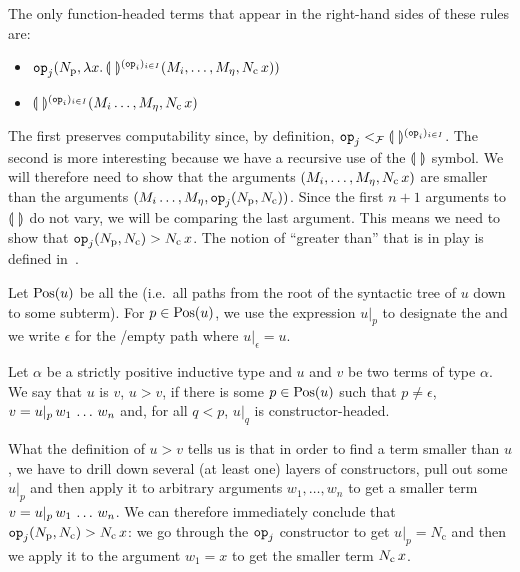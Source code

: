 The only function-headed terms that appear in the right-hand sides of these
rules are:

\begin{itemize}
\item
  $\mathtt{op}_j(N_{\mathrm{p}}, \lambda x.\, \llparenthesis \,  \, \rrparenthesis^{(\mathtt{op}_i)_{i \in I}}(M_i,
    \ldots, M_\eta, N_{\mathrm{c}}\,x))$
\item
  $\llparenthesis \,  \, \rrparenthesis^{(\mathtt{op}_i)_{i \in I}}(M_i \ldots, M_\eta,
  N_{\mathrm{c}}\,x)$
\end{itemize}

The first preserves computability since, by definition,
$\mathtt{op}_j <_{\mathcal{F}} \llparenthesis \,  \, \rrparenthesis^{(\mathtt{op}_i)_{i \in I}}$. The second is more
interesting because we have a recursive use of the $\llparenthesis \,  \, \rrparenthesis$ symbol. We
will therefore need to show that the arguments
$(M_i, \ldots, M_\eta, N_{\mathrm{c}}\,x)$ are smaller than the
arguments
$(M_i \ldots, M_\eta, \mathtt{op}_j(N_{\mathrm{p}}, N_{\mathrm{c}}))$. Since
the first $n + 1$ arguments to $\llparenthesis \,  \, \rrparenthesis$ do not vary, we will be
comparing the last argument. This means we need to show that
$\mathtt{op}_j(N_{\mathrm{p}}, N_{\mathrm{c}}) > N_{\mathrm{c}}\,x$. The
notion of ``greater than'' that is in play is defined
in~\cite{blanqui2002inductive}.

\begin{notation}
  Let $\operatorname{Pos}(u)$ be all the  (i.e.\ all
  paths from the root of the syntactic tree of $u$ down to some
  subterm). For $p \in \operatorname{Pos}(u)$, we use the expression $u|_p$ to designate
  the  and we write $\epsilon$ for
  the /empty path where $u|_\epsilon = u$.
\end{notation}

\begin{definition}\label{def:argument-ordering}
  Let $\alpha$ be a strictly positive inductive type and $u$ and $v$ be two
  terms of type $\alpha$. We say that $u$ is  $v$,
  $u > v$, if there is some $p \in \operatorname{Pos}(u)$ such that $p \neq \epsilon$,
  $v = u|_p\,w_1\,\ldots\,w_n$ and, for all $q < p$, $u|_q$ is
  constructor-headed.
\end{definition}

What the definition of $u > v$ tells us is that in order to find a term
smaller than $u$, we have to drill down several (at least one) layers of
constructors, pull out some $u|_p$ and then apply it to arbitrary arguments
$w_1, \ldots, w_n$ to get a smaller term
$v = u|_p\,w_1\,\ldots\,w_n$. We can therefore immediately conclude
that $\mathtt{op}_j(N_{\mathrm{p}}, N_{\mathrm{c}}) > N_{\mathrm{c}}\,x$:
we go through the $\mathtt{op}_j$ constructor to get $u|_p = N_{\mathrm{c}}$
and then we apply it to the argument $w_1 = x$ to get the smaller term
$N_{\mathrm{c}}\,x$.

